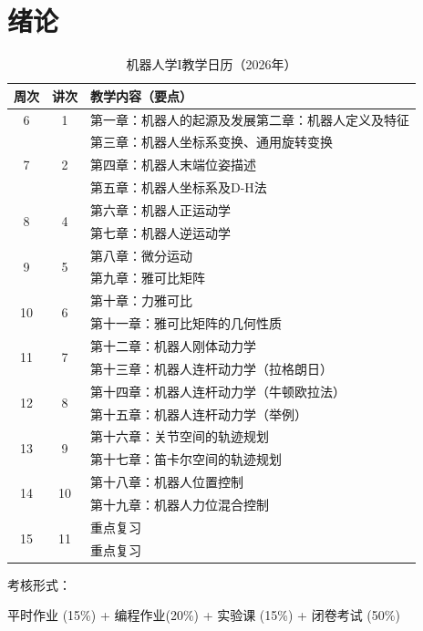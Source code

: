 \chapter{绪论}
\label{sec:01-introduction}

\begin{table}[htbp]
\centering
\begin{tabular}{@{} c c p{8cm} @{}}
\toprule
周次 & 讲次 & 教学内容（要点） \\
\midrule
6 & 1 & 第一章：机器人的起源及发展\newline 第二章：机器人定义及特征 \\
\midrule
\multirow{3}{*}{7} & \multirow{3}{*}{2} & 第三章：机器人坐标系变换、通用旋转变换 \\
& & 第四章：机器人末端位姿描述 \\
& & 第五章：机器人坐标系及D-H法 \\
\midrule
\multirow{2}{*}{8} & \multirow{2}{*}{4} & 第六章：机器人正运动学 \\
& & 第七章：机器人逆运动学 \\
\midrule
\multirow{2}{*}{9} & \multirow{2}{*}{5} & 第八章：微分运动 \\
& & 第九章：雅可比矩阵 \\
\midrule
\multirow{2}{*}{10} & \multirow{2}{*}{6} & 第十章：力雅可比 \\
& & 第十一章：雅可比矩阵的几何性质 \\
\midrule
\multirow{2}{*}{11} & \multirow{2}{*}{7} & 第十二章：机器人刚体动力学 \\
& & 第十三章：机器人连杆动力学（拉格朗日） \\
\midrule
\multirow{2}{*}{12} & \multirow{2}{*}{8} & 第十四章：机器人连杆动力学（牛顿欧拉法） \\
& & 第十五章：机器人连杆动力学（举例） \\
\midrule
\multirow{2}{*}{13} & \multirow{2}{*}{9} & 第十六章：关节空间的轨迹规划 \\
& & 第十七章：笛卡尔空间的轨迹规划 \\
\midrule
\multirow{2}{*}{14} & \multirow{2}{*}{10} & 第十八章：机器人位置控制 \\
& & 第十九章：机器人力位混合控制 \\
\midrule
\multirow{2}{*}{15} & \multirow{2}{*}{11} & 重点复习 \\
& & 重点复习 \\
\bottomrule
\end{tabular}
\caption{机器人学I教学日历（2026年）}
\end{table}

考核形式：

平时作业 (15\%) + 编程作业(20\%) + 实验课 (15\%) + 闭卷考试 (50\%)
